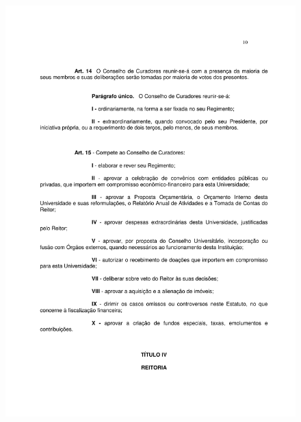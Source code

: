 \begin{figure}[p]
	\centering 
	\includegraphics[scale=0.7]{capitulos/resolucoes/cuni414/cuni414-10.pdf}
\end{figure}

